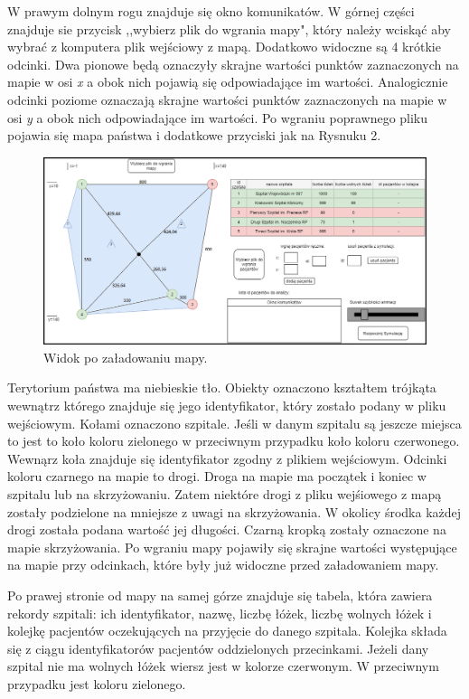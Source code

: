 \documentclass[10pt,a4paper]{article}
\begin{document}
W prawym dolnym rogu znajduje się okno komunikatów. W górnej części znajduje sie przycisk ,,wybierz plik do wgrania mapy", który należy wciskąć aby wybrać z komputera plik wejściowy z mapą. Dodatkowo widoczne są 4 krótkie odcinki. Dwa pionowe będą oznaczyły skrajne wartości punktów zaznaczonych na mapie w osi \textit{x} a obok nich pojawią się odpowiadające im wartości. Analogicznie odcinki poziome oznaczają skrajne wartości punktów zaznaczonych na mapie w osi \textit{y} a obok nich odpowiadające im wartości. Po wgraniu poprawnego pliku pojawia się mapa państwa i dodatkowe przyciski jak na Rysnuku 2.

\begin{figure}[h]
  \includegraphics[width=\linewidth]{./images/widok_z_mapa.png}
  \caption{Widok po załadowaniu mapy.}
  \label{fig:GUImap}
\end{figure}

Terytorium państwa ma niebieskie tło. Obiekty oznaczono kształtem trójkąta wewnątrz którego znajduje się jego identyfikator, który zostało podany w pliku wejściowym. Kołami oznaczono szpitale. Jeśli w danym szpitalu są jeszcze miejsca to jest to koło koloru zielonego w przeciwnym przypadku koło koloru czerwonego. Wewnąrz koła znajduje się identyfikator zgodny z plikiem wejściowym. Odcinki koloru czarnego na mapie to drogi. Droga na mapie ma początek i koniec w szpitalu lub na skrzyżowaniu. Zatem niektóre drogi z pliku wejśiowego z mapą zostały podzielone na mniejsze z uwagi na skrzyżowania. W okolicy środka każdej drogi została podana wartość jej długości. Czarną kropką zostały oznaczone na mapie skrzyżowania. Po wgraniu mapy pojawiły się skrajne wartości występujące na mapie przy odcinkach, które były już widoczne przed załadowaniem mapy.

Po prawej stronie od mapy na samej górze znajduje się tabela, która zawiera rekordy szpitali: ich identyfikator, nazwę, liczbę łóżek, liczbę wolnych łóżek i kolejkę pacjentów oczekujących na przyjęcie do danego szpitala. Kolejka składa się z ciągu identyfikatorów pacjentów oddzielonych przecinkami. Jeżeli dany szpital nie ma wolnych łóżek wiersz jest w kolorze czerwonym. W przeciwnym przypadku jest koloru zielonego.
\end{document}
